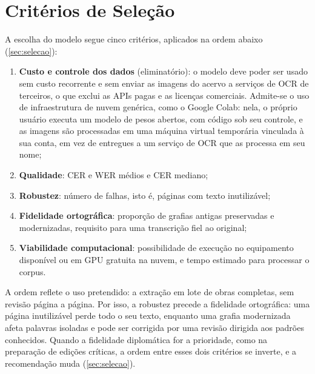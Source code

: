 \documentclass[noabntexcite,oneside]{ufsc-thesis-rn46-2019}
\begin{document}
\section{Critérios de Seleção}
\label{sec:criterios}

A escolha do modelo segue cinco critérios, aplicados na ordem abaixo
(\autoref{sec:selecao}):

\begin{enumerate}
    \item \textbf{Custo e controle dos dados} (eliminatório): o modelo deve poder ser usado
    sem custo recorrente e sem enviar as imagens do acervo a serviços de OCR de terceiros,
    o que exclui as APIs pagas e as licenças comerciais. Admite-se o uso de infraestrutura
    de nuvem genérica, como o Google Colab: nela, o próprio usuário executa um modelo de
    pesos abertos, com código sob seu controle, e as imagens são processadas em uma
    máquina virtual temporária vinculada à sua conta, em vez de entregues a um serviço de
    OCR que as processa em seu nome;
    \item \textbf{Qualidade}: CER e WER médios e CER mediano;
    \item \textbf{Robustez}: número de falhas, isto é, páginas com texto inutilizável;
    \item \textbf{Fidelidade ortográfica}: proporção de grafias antigas preservadas e
    modernizadas, requisito para uma transcrição fiel ao original;
    \item \textbf{Viabilidade computacional}: possibilidade de execução no equipamento
    disponível ou em GPU gratuita na nuvem, e tempo estimado para processar o corpus.
\end{enumerate}

A ordem reflete o uso pretendido: a extração em lote de obras completas, sem revisão
página a página. Por isso, a robustez precede a fidelidade ortográfica: uma página
inutilizável perde todo o seu texto, enquanto uma grafia modernizada afeta palavras
isoladas e pode ser corrigida por uma revisão dirigida aos padrões conhecidos. Quando a
fidelidade diplomática for a prioridade, como na preparação de edições críticas, a ordem
entre esses dois critérios se inverte, e a recomendação muda (\autoref{sec:selecao}).

\end{document}
